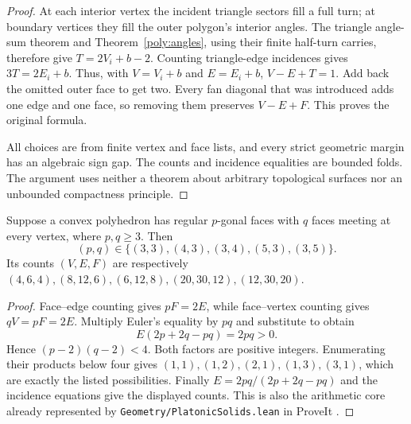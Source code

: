 \begin{proof}
At each interior vertex the incident triangle sectors fill a full turn;
at boundary vertices they fill the outer polygon's interior angles.
The triangle angle-sum theorem and Theorem~\ref{poly:angles}, using
their finite half-turn carries, therefore give
$T=2V_i+b-2$. Counting triangle-edge incidences gives $3T=2E_i+b$.
Thus, with $V=V_i+b$ and $E=E_i+b$,
$V-E+T=1$. Add back the omitted outer face to get two. Every fan
diagonal that was introduced adds one edge and one face, so removing
them preserves $V-E+F$. This proves the original formula.

All choices are from finite vertex and face lists, and every strict
geometric margin has an algebraic sign gap. The counts and incidence
equalities are bounded folds. The argument uses neither a theorem about
arbitrary topological surfaces nor an unbounded compactness principle.
\end{proof}

\begin{theorem}
\label{sol:five-types}
Suppose a convex polyhedron has regular $p$-gonal faces with $q$ faces
meeting at every vertex, where $p,q\ge3$. Then
\[
 (p,q)\in\{(3,3),(4,3),(3,4),(5,3),(3,5)\}.
\]
Its counts $(V,E,F)$ are respectively
$(4,6,4),(8,12,6),(6,12,8),(20,30,12),(12,30,20)$.
\end{theorem}
\begin{proof}
Face--edge counting gives $pF=2E$, while face--vertex counting gives
$qV=pF=2E$. Multiply Euler's equality
by $pq$ and substitute to obtain
\[
 E(2p+2q-pq)=2pq>0.
\]
Hence $(p-2)(q-2)<4$. Both factors are positive integers. Enumerating
their products below four gives $(1,1),(1,2),(2,1),(1,3),(3,1)$,
which are exactly the listed possibilities. Finally
$E=2pq/(2p+2q-pq)$ and the incidence equations give the displayed
counts. This is also the arithmetic core already represented by
\texttt{Geometry/PlatonicSolids.lean} in ProveIt \cite{platoniccore}.
\end{proof}

